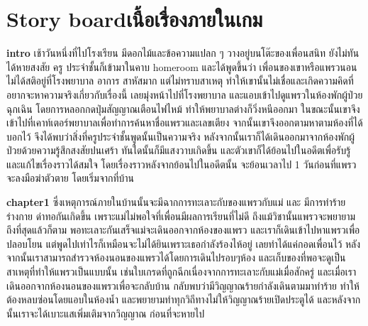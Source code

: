 \section{\ifenglish Story board\else เนื้อเรื่องภายในเกม\fi}

\textbf{intro}
เช้าวันหนึ่งที่ไปโรงเรียน มีดอกไม้และข้อความแปลก ๆ วางอยู่บนโต๊ะของเพื่อนสนิท ยังไม่ทันได้หายสงสัย ครู
ประจําชั้นก็เข้ามาในคาบ homeroom และได้พูดขึ้นว่า เพื่อนของเขาหรือแพรวนอนไม่ได้สติอยู่ที่โรงพยาบาล อาการ
สาหัสมาก แต่ไม่ทราบสาเหตุ ทําให้เขานั้นไม่เชื่อและเกิดความคิดที่อยากจะหาความจริงเกี่ยวกับเรื่องนี้ เลยมุ่งหน้าไปที่โรงพยาบาล และแอบเข้าไปดูแพรวในห้องพักผู้ป่วยฉุกเฉิน โดยการหลอกกดปุ่มสัญญาณเตือนไฟไหม้ ทำให้พยาบาลต่างก็วิ่งหนีออกมา ในขณะนั้นเขาจึงเข้าไปที่เคาท์เตอร์พยาบาลเพื่อทำการค้นหาชื่อแพรวและเลขเตียง จากนั้นเขาจึงออกตามหาตามห้องที่ได้บอกไว้ จึงได้พบว่าสิ่งที่ครูประจําชั้นพูดนั้นเป็นความจริง หลังจากนั้นเราก็ได้เดินออกมาจากห้องพักผู้ป่วยด้วยความรู้สึกสงสัยปนเศร้า ทันใดนั้นก็มีแสงวาบเกิดขึ้น และตัวเขาก็ได้ย้อนไปในอดีตเพื่อรับรู้และแก้ไขเรื่องราวได้สมใจ โดยเรื่องราวหลังจากย้อนไปในอดีตนั้น จะย้อนเวลาไป 1 วันก่อนที่แพรวจะลงมือฆ่าตัวตาย โดยเริ่มจากที่บ้าน
 
\textbf{chapter1}
ซึ่งเหตุการณ์ภายในบ้านนั้นจะมีฉากการทะเลาะกับของแพรวกับแม่ และ มีการทำร้ายร่างกาย ด่าทอกันเกิดขึ้น เพราะแม่ไม่พอใจที่เพื่อนมีผลการเรียนที่ไม่ดี ถึงแม้วิชานั้นแพรวจะพยายามถึงที่สุดแล้วก็ตาม
พอทะเลาะกันเสร็จแม่จะเดินออกจากห้องของแพรว และเราก็เดินเข้าไปหาแพรวเพื่อปลอบโยน แต่พูดไปเท่าไรก็เหมือนจะไม่ได้ยินเพราะเธอกำลังร้องไห้อยู่ เลยทำได้แค่กอดเพื่อนไว้ หลังจากนั้นเราสามารถสำรวจห้องนอนของแพรวได้โดยการเดินไปรอบๆห้อง และเก็บของที่พอจะดูเป็นสาเหตุที่ทำให้แพรวเป็นแบบนั้น เช่นใบเกรดที่ถูกฉีกเนื่องจากการทะเลาะกับแม่เมื่อสักครู่ และเมื่อเราเดินออกจากห้องนอนของแพรวเพื่อจะกลับบ้าน กลับพบว่ามีวิญญาณร้ายกำลังเดินตามมาทำร้าย ทำให้ต้องหลบซ่อนโดยแอบในห้องน้ำ และพยายามทำทุกวิถีทางไม่ให้วิญญาณร้ายเปิดประตูได้ และหลังจากนั้นเราจะได้เบาะแสเพิ่มเติมจากวิญญาณ ก่อนที่จะหายไป 

